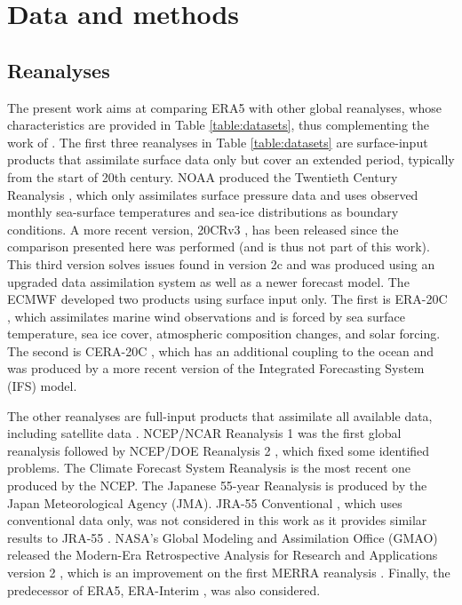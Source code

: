 \documentclass[alpha-refs]{wiley-article}
\begin{document}
\section{Data and methods}
\label{sec:data_methods}

\subsection{Reanalyses}
\label{sec:reanalyses}

The present work aims at comparing ERA5 \citep{Hersbach2020} with other global reanalyses, whose characteristics are provided in Table \ref{table:datasets}, thus complementing the work of \citet{Horton2018b}. The first three reanalyses in Table \ref{table:datasets} are surface-input \citep{Fujiwara2017} products that assimilate surface data only but cover an extended period, typically from the start of 20th century. NOAA produced the Twentieth Century Reanalysis \citep[version 2c, 20CR-2c --][]{Compo2011}, which only assimilates surface pressure data and uses observed monthly sea-surface temperatures and sea-ice distributions as boundary conditions. A more recent version, 20CRv3 \citep{Slivinski2019, Slivinski2021}, has been released since the comparison presented here was performed (and is thus not part of this work). This third version solves issues found in version 2c and was produced using an upgraded data assimilation system as well as a newer forecast model. The ECMWF developed two products using surface input only. The first is ERA-20C \citep{Poli2016}, which assimilates marine wind observations and is forced by sea surface temperature, sea ice cover, atmospheric composition changes, and solar forcing. The second is CERA-20C \citep{Laloyaux2018a}, which has an additional coupling to the ocean and was produced by a more recent version of the Integrated Forecasting System (IFS) model.

The other reanalyses are full-input products that assimilate all available data, including satellite data \citep{Fujiwara2017}. NCEP/NCAR Reanalysis 1 \citep[NR-1 --][]{Kalnay1996, Kistler2001} was the first global reanalysis followed by NCEP/DOE Reanalysis 2 \citep[NR-2 --][]{Kanamitsu2002}, which fixed some identified problems. The Climate Forecast System Reanalysis \citep[CFSR --][]{Saha2010a} is the most recent one produced by the NCEP. The Japanese 55-year Reanalysis \citep[JRA-55 --][]{Kobayashi2015, Harada2016} is produced by the Japan Meteorological Agency (JMA). JRA-55 Conventional \citep[JRA-55C --][]{Kobayashi2014}, which uses conventional data only, was not considered in this work as it provides similar results to JRA-55 \citep{Horton2018b}. NASA's Global Modeling and Assimilation Office (GMAO) released the Modern-Era Retrospective Analysis for Research and Applications version 2 \citep[MERRA-2 -- ][]{Gelaro2017}, which is an improvement on the first MERRA reanalysis \citep{Rienecker2011}. Finally, the predecessor of ERA5, ERA-Interim \citep[ERA-INT --][]{Dee2011a}, was also considered.
\end{document}
